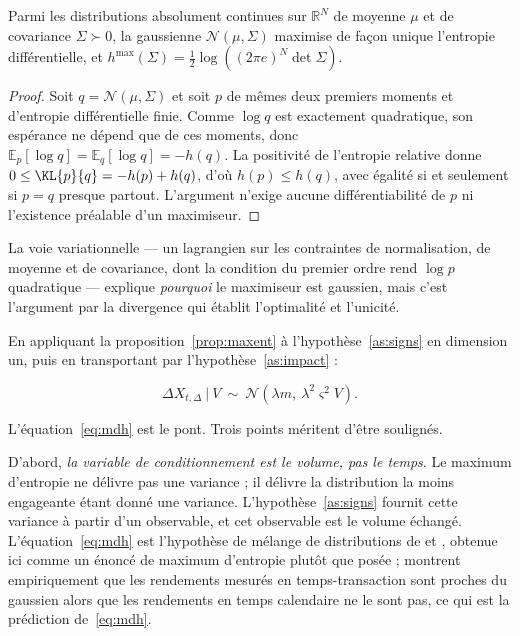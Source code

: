 \begin{proposition}
\label{prop:maxent}
Parmi les distributions absolument continues sur $\mathbb{R}^N$ de moyenne $\mu$
et de covariance $\Sigma\succ0$, la gaussienne $\mathcal N(\mu,\Sigma)$ maximise
de façon unique l'entropie différentielle, et
$h^{\max}(\Sigma)=\tfrac12\log\left((2\pi e)^N\det\Sigma\right)$.
\end{proposition}

\begin{proof}
Soit $q=\mathcal N(\mu,\Sigma)$ et soit $p$ de mêmes deux premiers moments et
d'entropie différentielle finie. Comme $\log q$ est exactement quadratique, son
espérance ne dépend que de ces moments, donc
$\mathbb{E}_p[\log q]=\mathbb{E}_q[\log q]=-h(q)$. La positivité de l'entropie
relative donne $0\le \KL{p}{q} = -h(p)+h(q)$, d'où $h(p)\le h(q)$, avec égalité
si et seulement si $p=q$ presque partout. L'argument n'exige aucune
différentiabilité de $p$ ni l'existence préalable d'un maximiseur.
\end{proof}

La voie variationnelle --- un lagrangien sur les contraintes de normalisation, de
moyenne et de covariance, dont la condition du premier ordre rend $\log p$
quadratique --- explique \emph{pourquoi} le maximiseur est gaussien, mais c'est
l'argument par la divergence qui établit l'optimalité et l'unicité.

En appliquant la proposition~\ref{prop:maxent} à
l'hypothèse~\ref{as:signs} en dimension un, puis en transportant par
l'hypothèse~\ref{as:impact} :

\begin{equation}
\label{eq:mdh}
\Delta X_{t,\Delta}\ \big|\ V \ \sim\ \mathcal{N}\!\left(\lambda m,\ \lambda^2\varsigma^2 V\right).
\end{equation}

L'équation~\eqref{eq:mdh} est le pont. Trois points méritent d'être soulignés.

D'abord, \emph{la variable de conditionnement est le volume, pas le temps}. Le
maximum d'entropie ne délivre pas une variance ; il délivre la distribution la
moins engageante étant donné une variance. L'hypothèse~\ref{as:signs} fournit
cette variance à partir d'un observable, et cet observable est le volume échangé.
L'équation~\eqref{eq:mdh} est l'hypothèse de mélange de distributions de
\citet{clark1973} et \citet{tauchen1983}, obtenue ici comme un énoncé de maximum
d'entropie plutôt que posée ; \citet{ane2000} montrent empiriquement que les
rendements mesurés en temps-transaction sont proches du gaussien alors que les
rendements en temps calendaire ne le sont pas, ce qui est la prédiction
de~\eqref{eq:mdh}.

